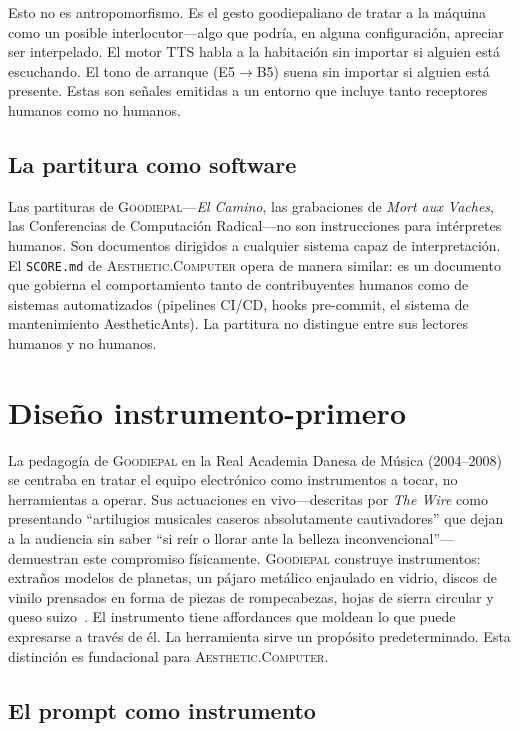 \documentclass[10pt,letterpaper,twocolumn]{article}
\newcommand{\ac}{\textsc{Aesthetic.Computer}}
\newcommand{\gp}{\textsc{Goodiepal}}
\begin{document}
Esto no es antropomorfismo. Es el gesto goodiepaliano de tratar a la máquina como un posible interlocutor---algo que podría, en alguna configuración, apreciar ser interpelado. El motor TTS habla a la habitación sin importar si alguien está escuchando. El tono de arranque (E5$\rightarrow$B5) suena sin importar si alguien está presente. Estas son señales emitidas a un entorno que incluye tanto receptores humanos como no humanos.

\subsection{La partitura como software}

Las partituras de \gp{}---\emph{El Camino}, las grabaciones de \emph{Mort aux Vaches}, las Conferencias de Computación Radical---no son instrucciones para intérpretes humanos. Son documentos dirigidos a cualquier sistema capaz de interpretación. El \texttt{SCORE.md} de \ac{} opera de manera similar: es un documento que gobierna el comportamiento tanto de contribuyentes humanos como de sistemas automatizados (pipelines CI/CD, hooks pre-commit, el sistema de mantenimiento AestheticAnts). La partitura no distingue entre sus lectores humanos y no humanos.

\section{Diseño instrumento-primero}

La pedagogía de \gp{} en la Real Academia Danesa de Música (2004--2008) se centraba en tratar el equipo electrónico como instrumentos a tocar, no herramientas a operar. Sus actuaciones en vivo---descritas por \emph{The Wire} como presentando ``artilugios musicales caseros absolutamente cautivadores'' que dejan a la audiencia sin saber ``si reír o llorar ante la belleza inconvencional''---demuestran este compromiso físicamente. \gp{} construye instrumentos: extraños modelos de planetas, un pájaro metálico enjaulado en vidrio, discos de vinilo prensados en forma de piezas de rompecabezas, hojas de sierra circular y queso suizo~\citep{inspite2024goodiepal}. El instrumento tiene affordances que moldean lo que puede expresarse a través de él. La herramienta sirve un propósito predeterminado. Esta distinción es fundacional para \ac{}.

\subsection{El prompt como instrumento}
\end{document}
